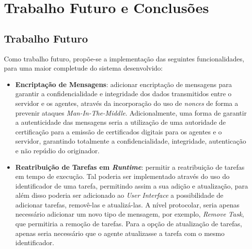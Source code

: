\documentclass[a4paper,12pt]{scrreprt}
\begin{document}




\chapter{Trabalho Futuro e Conclusões}

\section{Trabalho Futuro}

Como trabalho futuro, propõe-se a implementação das seguintes funcionalidades,
para uma maior completude do sistema desenvolvido:

\begin{itemize}
    \item \textbf{Encriptação de Mensagens}: adicionar encriptação de
    mensagens para garantir a confidencialidade e integridade dos dados transmitidos entre
    o servidor e os agentes, através da incorporação do uso de \textit{nonces}
    de forma a prevenir ataques \textit{Man-In-The-Middle}. Adicionalmente, uma forma de
    garantir a autenticidade das mensagens seria a utilização de uma autoridade de certificação
    para a emissão de certificados digitais para os agentes e o servidor, garantindo totalmente
    a confidencialidade, integridade, autenticação e não repúdio do originador.

    \item \textbf{Reatribuição de Tarefas em \textit{Runtime}}: permitir a reatribuição
    de tarefas em tempo de execução. Tal poderia ser implementado
    através do uso do identificador de uma tarefa, permitindo assim a sua adição e atualização,
    para além disso poderia ser adicionado ao \textit{User Interface} a possibilidade de
    adicionar tarefas, removê-las e atualizá-las. A nível protocolar, seria apenas necessário
    adicionar um novo tipo de mensagem, por exemplo, \textit{Remove Task}, que permitiria
    a remoção de tarefas. Para a opção de atualização de tarefas, apenas seria necessário
    que o agente atualizasse a tarefa com o mesmo identificador.
\end{itemize}
\end{document}
